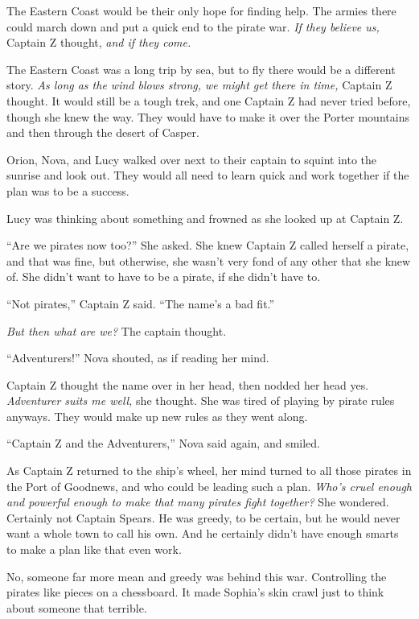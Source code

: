 \documentclass[12pt]{extbook}
\begin{document}
  The Eastern Coast would be their only hope for finding help. The armies
  there could march down and put a quick end to the pirate war. \emph{If
  they believe us,} Captain Z thought, \emph{and if they come.}
  
  The Eastern Coast was a long trip by sea, but to fly there would be a
  different story. \emph{As long as the wind blows strong, we might get
  there in time,} Captain Z thought. It would still be a tough trek, and
  one Captain Z had never tried before, though she knew the way. They
  would have to make it over the Porter mountains and then through the
  desert of Casper.
  
  Orion, Nova, and Lucy walked over next to their captain to squint into
  the sunrise and look out. They would all need to learn quick and work
  together if the plan was to be a success.
  
  Lucy was thinking about something and frowned as she looked up at
  Captain Z.
  
  \enquote{Are we pirates now too?} She asked. She knew Captain Z called
  herself a pirate, and that was fine, but otherwise, she wasn't very fond
  of any other that she knew of. She didn't want to have to be a pirate,
  if she didn't have to.
  
  \enquote{Not pirates,} Captain Z said. \enquote{The name's a bad fit.}
  
  \emph{But then what are we?} The captain thought.
  
  \enquote{Adventurers!} Nova shouted, as if reading her mind.
  
  Captain Z thought the name over in her head, then nodded her head yes.
  \emph{Adventurer suits me well,} she thought. She was tired of playing
  by pirate rules anyways. They would make up new rules as they went
  along.
  
  \enquote{Captain Z and the Adventurers,} Nova said again, and smiled.
  
  As Captain Z returned to the ship's wheel, her mind turned to all those
  pirates in the Port of Goodnews, and who could be leading such a plan.
  \emph{Who's cruel enough and powerful enough to make that many pirates
  fight together?} She wondered. Certainly not Captain Spears. He was
  greedy, to be certain, but he would never want a whole town to call his
  own. And he certainly didn't have enough smarts to make a plan like that
  even work.
  
  No, someone far more mean and greedy was behind this war. Controlling
  the pirates like pieces on a chessboard. It made Sophia's skin crawl
  just to think about someone that terrible.
  
\end{document}
